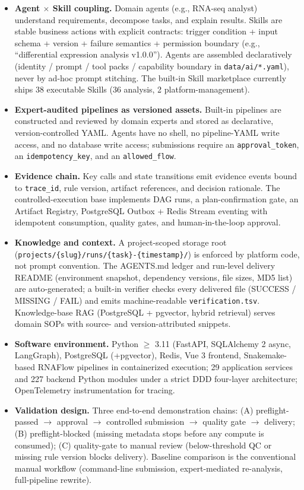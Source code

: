 \documentclass[11pt,a4paper]{article}
\begin{document}
\begin{itemize}
  \item \textbf{Agent $\times$ Skill coupling.} Domain agents (e.g., RNA-seq analyst) understand requirements, decompose tasks, and explain results. Skills are stable business actions with explicit contracts: trigger condition + input schema + version + failure semantics + permission boundary (e.g., ``differential expression analysis v1.0.0''). Agents are assembled declaratively (identity / prompt / tool packs / capability boundary in \texttt{data/ai/*.yaml}), never by ad-hoc prompt stitching. The built-in Skill marketplace currently ships 38 executable Skills (36 analysis, 2 platform-management).
  \item \textbf{Expert-audited pipelines as versioned assets.} Built-in pipelines are constructed and reviewed by domain experts and stored as declarative, version-controlled YAML. Agents have no shell, no pipeline-YAML write access, and no database write access; submissions require an \texttt{approval\_token}, an \texttt{idempotency\_key}, and an \texttt{allowed\_flow}.
  \item \textbf{Evidence chain.} Key calls and state transitions emit evidence events bound to \texttt{trace\_id}, rule version, artifact references, and decision rationale. The controlled-execution base implements DAG runs, a plan-confirmation gate, an Artifact Registry, PostgreSQL Outbox + Redis Stream eventing with idempotent consumption, quality gates, and human-in-the-loop approval.
  \item \textbf{Knowledge and context.} A project-scoped storage root (\texttt{projects/\{slug\}/runs/\{task\}-\{timestamp\}/}) is enforced by platform code, not prompt convention. The AGENTS.md ledger and run-level delivery README (environment snapshot, dependency versions, file sizes, MD5 list) are auto-generated; a built-in verifier checks every delivered file (SUCCESS / MISSING / FAIL) and emits machine-readable \texttt{verification.tsv}. Knowledge-base RAG (PostgreSQL + pgvector, hybrid retrieval) serves domain SOPs with source- and version-attributed snippets.
  \item \textbf{Software environment.} Python $\geq$ 3.11 (FastAPI, SQLAlchemy 2 async, LangGraph), PostgreSQL (+pgvector), Redis, Vue 3 frontend, Snakemake-based RNAFlow pipelines in containerized execution; 29 application services and 227 backend Python modules under a strict DDD four-layer architecture; OpenTelemetry instrumentation for tracing.
  \item \textbf{Validation design.} Three end-to-end demonstration chains: (A) preflight-passed $\rightarrow$ approval $\rightarrow$ controlled submission $\rightarrow$ quality gate $\rightarrow$ delivery; (B) preflight-blocked (missing metadata stops before any compute is consumed); (C) quality-gate to manual review (below-threshold QC or missing rule version blocks delivery). Baseline comparison is the conventional manual workflow (command-line submission, expert-mediated re-analysis, full-pipeline rewrite).
\end{itemize}
\end{document}
